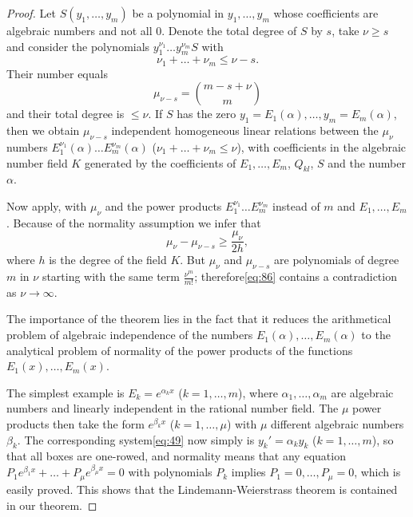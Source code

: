 \begin{proof}
Let $S(y_1, \dots, y_m)$ be a polynomial in $y_1, \dots, y_m$ whose coefficients are algebraic numbers and not all 0. Denote the total degree of $S$ by $s$, take $\nu \ge s$ and consider the polynomials $y_1^{\nu_1} \dots y_m^{\nu_m} S$ with
\[\nu_1 + \dots + \nu_m \le \nu - s.\]
Their number equals
\[\mu_{\nu-s} = \binom{m-s+\nu}{m}\]
and their total degree is $\le \nu$. If $S$ has the zero $y_1 = E_1(\alpha), \dots, y_m = E_m(\alpha)$, then we obtain $\mu_{\nu-s}$ independent homogeneous linear relations between the $\mu_{\nu}$ numbers $E_1^{\nu_1}(\alpha) \dots E_m^{\nu_m}(\alpha)$ ($\nu_1 + \dots + \nu_m \le \nu$), with coefficients in the algebraic number field $K$ generated by the coefficients of $E_1, \dots, E_m$, $Q_{kl}$, $S$ and the number $\alpha$.

Now apply, with $\mu_{\nu}$ and the power products $E_1^{\nu_1} \dots E_m^{\nu_m}$ instead of $m$ and $E_1, \dots, E_m$. Because of the normality assumption we infer that
\begin{equation}
\mu_{\nu} - \mu_{\nu-s} \ge \frac{\mu_{\nu}}{2h}, \tag{86}\label{eq:86}
\end{equation}
where $h$ is the degree of the field $K$. But $\mu_{\nu}$ and $\mu_{\nu-s}$ are polynomials of degree $m$ in $\nu$ starting with the same term $\frac{\nu^m}{m!}$; therefore\eqref{eq:86} contains a contradiction as $\nu \to \infty$.

The importance of the theorem lies in the fact that it reduces the arithmetical problem of algebraic independence of the numbers $E_1(\alpha), \dots, E_m(\alpha)$ to the analytical problem of normality of the power products of the functions $E_1(x), \dots, E_m(x)$.

The simplest example is $E_k = e^{\alpha_k x}$ ($k=1, \dots, m$), where $\alpha_1, \dots, \alpha_m$ are algebraic numbers and linearly independent in the rational number field. The $\mu$ power products then take the form $e^{\beta_k x}$ ($k=1, \dots, \mu$) with $\mu$ different algebraic numbers $\beta_k$. The corresponding system\eqref{eq:49} now simply is $y_k' = \alpha_k y_k$ ($k=1, \dots, m$), so that all boxes are one-rowed, and normality means that any equation $P_1 e^{\beta_1 x} + \dots + P_{\mu} e^{\beta_{\mu} x} = 0$ with polynomials $P_k$ implies $P_1 = 0, \dots, P_{\mu} = 0$, which is easily proved. This shows that the Lindemann-Weierstrass theorem is contained in our theorem.
\end{proof}

